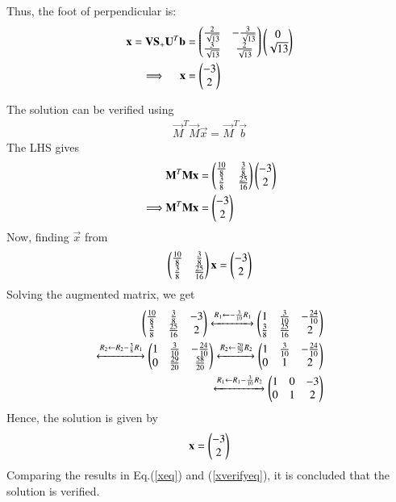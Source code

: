 \documentclass[journal,12pt,twocolumn]{IEEEtran}
\begin{document}
Thus, the foot of perpendicular is:
\begin{align}
\vec{x} = \vec{V}\vec{S}_{+}\vec{U}^T\vec{b} 
	&= \myvec{\frac{2}{\sqrt{13}} & -\frac{3}{\sqrt{13}} \\
		\frac{3}{\sqrt{13}} & \frac{2}{\sqrt{13}} }
	  \myvec{ 0 \\ \sqrt{13} }
	\\
	\implies \quad
\vec{x} &= \myvec{ -3 \\ 2 }  	\label{xeq}
\end{align}

The solution can be verified using
\begin{align}
	\vec{M}^T\vec{M}\vec{x} = \vec{M}^T\vec{b}
\end{align}
The LHS gives
\begin{align}
	& \mathbf{M}^T\mathbf{M}\mathbf{x} 
	= \begin{pmatrix}\frac{10}{8} & \frac{3}{8} \\ \frac{3}{8} & \frac{25}{16} \end{pmatrix}
	\begin{pmatrix}-3 \\ 2\end{pmatrix} \\
	\implies
	& \mathbf{M}^T\mathbf{M}\mathbf{x} = \begin{pmatrix}-3 \\ 2\end{pmatrix} 
\end{align}
Now, finding $\vec{x}$ from 
\begin{align}
	\begin{pmatrix}\frac{10}{8} & \frac{3}{8} \\ \frac{3}{8} & \frac{25}{16} \end{pmatrix}
	\mathbf{x} = \begin{pmatrix}-3 \\ 2\end{pmatrix} 
\end{align}
Solving the augmented matrix, we get
\begin{align}
     \begin{pmatrix}\frac{10}{8} & \frac{3}{8} & -3 \\ \frac{3}{8} & \frac{25}{16} & 2\end{pmatrix}
	\xleftrightarrow[]{R_1 \leftarrow -\frac{3}{10}R_1}
     \begin{pmatrix}1 & \frac{3}{10} &-\frac{24}{10} \\ \frac{3}{8} & \frac{25}{16} & 2\end{pmatrix}
	\\
	\xleftrightarrow[]{R_2 \leftarrow R_2-\frac{3}{8}R_1}
	\begin{pmatrix}1 & \frac{3}{10} &-\frac{24}{10} \\ 
		0 & \frac{29}{20} & \frac{58}{20} \end{pmatrix}
	\xleftrightarrow[]{R_2 \leftarrow \frac{20}{29}R_2} \begin{pmatrix}1 & \frac{3}{10} &-\frac{24}{10} \\ 0 & 1 & 2 \end{pmatrix} \\
	\xleftrightarrow[]{R_1 \leftarrow R_1-\frac{3}{10}R_2}
	\begin{pmatrix}1 & 0 & -3 \\ 0 & 1 & 2\end{pmatrix}
\end{align}
Hence, the solution is given by
\begin{align}
	\vec{x} = \myvec{ -3 \\ 2 } 	\label{xverifyeq}
\end{align}
Comparing the results in Eq.(\ref{xeq}) and (\ref{xverifyeq}), it is
concluded that the solution is verified.
\end{document}
